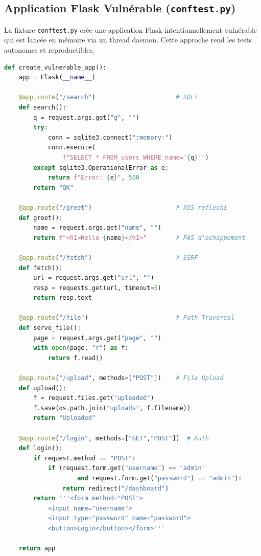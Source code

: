 \documentclass[12pt,a4paper]{report}
\newcommand{\code}[1]{\texttt{#1}}
\begin{document}
\subsection{Application Flask Vulnérable (\texttt{conftest.py})}

La fixture \code{conftest.py} crée une application Flask intentionnellement vulnérable qui
est lancée en mémoire via un thread daemon. Cette approche rend les tests autonomes et
reproductibles.

\begin{lstlisting}[language=python, caption={Application Flask vulnérable — fixture de test}]
def create_vulnerable_app():
    app = Flask(__name__)

    @app.route("/search")                      # SQLi
    def search():
        q = request.args.get("q", "")
        try:
            conn = sqlite3.connect(":memory:")
            conn.execute(
                f"SELECT * FROM users WHERE name='{q}'")
        except sqlite3.OperationalError as e:
            return f"Error: {e}", 500
        return "OK"

    @app.route("/greet")                       # XSS reflechi
    def greet():
        name = request.args.get("name", "")
        return f"<h1>Hello {name}</h1>"        # PAS d'echappement

    @app.route("/fetch")                       # SSRF
    def fetch():
        url = request.args.get("url", "")
        resp = requests.get(url, timeout=5)
        return resp.text

    @app.route("/file")                        # Path Traversal
    def serve_file():
        page = request.args.get("page", "")
        with open(page, "r") as f:
            return f.read()

    @app.route("/upload", methods=["POST"])    # File Upload
    def upload():
        f = request.files.get("uploaded")
        f.save(os.path.join("uploads", f.filename))
        return "Uploaded"

    @app.route("/login", methods=["GET","POST"])  # Auth
    def login():
        if request.method == "POST":
            if (request.form.get("username") == "admin"
                    and request.form.get("password") == "admin"):
                return redirect("/dashboard")
        return '''<form method="POST">
            <input name="username">
            <input type="password" name="password">
            <button>Login</button></form>'''

    return app
\end{lstlisting}
\end{document}
